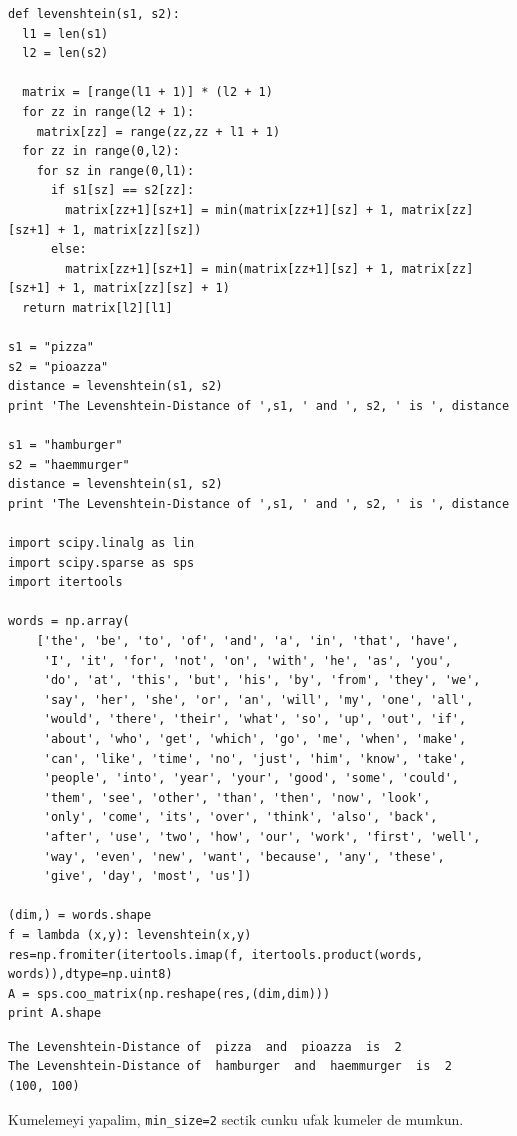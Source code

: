 \documentclass[12pt,fleqn]{article}\usepackage{../common}
\begin{document}
\begin{verbatim}
def levenshtein(s1, s2):
  l1 = len(s1)
  l2 = len(s2)

  matrix = [range(l1 + 1)] * (l2 + 1)
  for zz in range(l2 + 1):
    matrix[zz] = range(zz,zz + l1 + 1)
  for zz in range(0,l2):
    for sz in range(0,l1):
      if s1[sz] == s2[zz]:
        matrix[zz+1][sz+1] = min(matrix[zz+1][sz] + 1, matrix[zz][sz+1] + 1, matrix[zz][sz])
      else:
        matrix[zz+1][sz+1] = min(matrix[zz+1][sz] + 1, matrix[zz][sz+1] + 1, matrix[zz][sz] + 1)
  return matrix[l2][l1]

s1 = "pizza"
s2 = "pioazza"   
distance = levenshtein(s1, s2)       
print 'The Levenshtein-Distance of ',s1, ' and ', s2, ' is ', distance

s1 = "hamburger"
s2 = "haemmurger"   
distance = levenshtein(s1, s2)       
print 'The Levenshtein-Distance of ',s1, ' and ', s2, ' is ', distance

import scipy.linalg as lin
import scipy.sparse as sps
import itertools

words = np.array(
    ['the', 'be', 'to', 'of', 'and', 'a', 'in', 'that', 'have',
     'I', 'it', 'for', 'not', 'on', 'with', 'he', 'as', 'you',
     'do', 'at', 'this', 'but', 'his', 'by', 'from', 'they', 'we',
     'say', 'her', 'she', 'or', 'an', 'will', 'my', 'one', 'all',
     'would', 'there', 'their', 'what', 'so', 'up', 'out', 'if',
     'about', 'who', 'get', 'which', 'go', 'me', 'when', 'make',
     'can', 'like', 'time', 'no', 'just', 'him', 'know', 'take',
     'people', 'into', 'year', 'your', 'good', 'some', 'could',
     'them', 'see', 'other', 'than', 'then', 'now', 'look',
     'only', 'come', 'its', 'over', 'think', 'also', 'back',
     'after', 'use', 'two', 'how', 'our', 'work', 'first', 'well',
     'way', 'even', 'new', 'want', 'because', 'any', 'these',
     'give', 'day', 'most', 'us'])

(dim,) = words.shape
f = lambda (x,y): levenshtein(x,y)
res=np.fromiter(itertools.imap(f, itertools.product(words, words)),dtype=np.uint8)
A = sps.coo_matrix(np.reshape(res,(dim,dim)))
print A.shape
\end{verbatim}

\begin{verbatim}
The Levenshtein-Distance of  pizza  and  pioazza  is  2
The Levenshtein-Distance of  hamburger  and  haemmurger  is  2
(100, 100)
\end{verbatim}

Kumelemeyi yapalim, \verb!min_size=2! sectik cunku ufak kumeler de mumkun.
\end{document}
